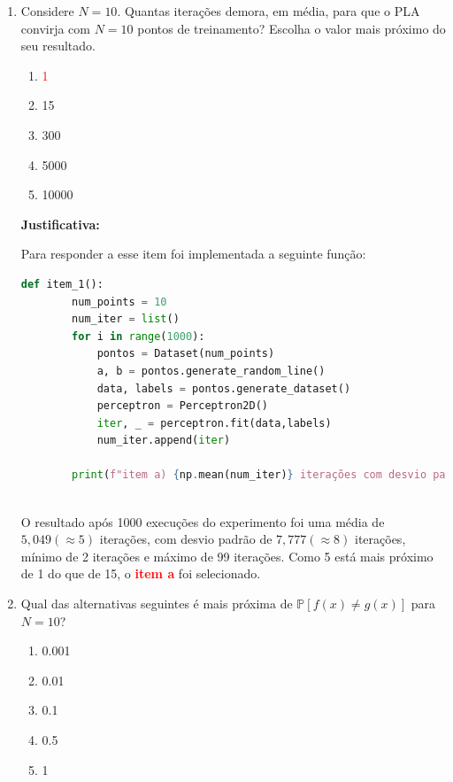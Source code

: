 \begin{enumerate}
    \item Considere $N = 10$. Quantas iterações demora, em média, para que o PLA convirja com $N = 10$
    pontos de treinamento? Escolha o valor mais próximo do seu resultado.

    \begin{enumerate}
        \item[\textcolor{red}{(a)}]\textcolor{red}{1}\addtocounter{enumii}{1}
        \item 15
        \item 300
        \item 5000
        \item 10000
    \end{enumerate}
     
    \par

    \textbf{Justificativa:}

    Para responder a esse item foi implementada a seguinte função:

    \begin{lstlisting}[language=Python, caption=Item 1, label=cod:]
        def item_1():
        num_points = 10
        num_iter = list()
        for i in range(1000):
            pontos = Dataset(num_points)
            a, b = pontos.generate_random_line()
            data, labels = pontos.generate_dataset()
            perceptron = Perceptron2D()
            iter, _ = perceptron.fit(data,labels)
            num_iter.append(iter)
    
        print(f"item a) {np.mean(num_iter)} iterações com desvio padrão {np.std(num_iter):.4f} (min:{np.min(num_iter)}, máx:{np.max(num_iter)})"
    
    \end{lstlisting}

    O resultado após 1000 execuções do experimento foi uma média de $5,049(\approx 5)$ iterações, com desvio padrão de $7,777 (\approx 8)$ iterações, mínimo de 2 iterações e máximo de 99 iterações. Como 5 está mais próximo de 1 do que de 15, o \textcolor{red}{\textbf{item a}} foi selecionado. 
    
    \item Qual das alternativas seguintes é mais próxima de $\mathbb{P}[f(x) \neq g(x)]$ para $N = 10$?
    
    \begin{enumerate}
        \item 0.001
        \item 0.01
        \item 0.1
        \item 0.5
        \item 1
    \end{enumerate}
     

\end{enumerate}
